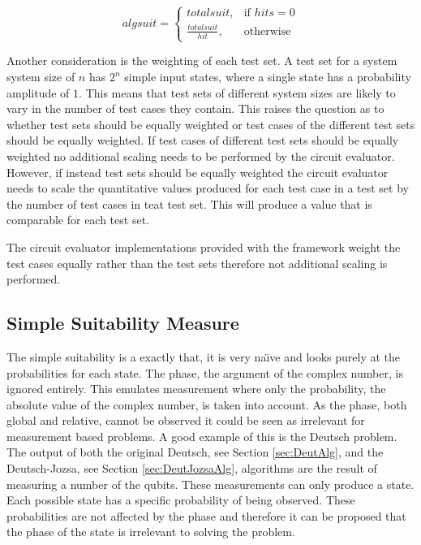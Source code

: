 \begin{equation}
 algsuit = 
\left\{
  \begin{array}{cc} totalsuit, & \mbox{if } hits={0}\\ 
  \frac{totalsuit}{hit}, & \mbox{otherwise}\end{array}
\right.
\label{eqn:cirevalhitsscaling}
\end{equation}

Another consideration is the weighting of each test set.
A test set for a system system size of $n$ has $2^n$ simple input states, where a single state has a probability amplitude of $1$.
This means that test sets of different system sizes are likely to vary in the number of test cases they contain.
This raises the question as to whether test sets should be equally weighted or test cases of the different test sets should be equally weighted.
If test cases of different test sets should be equally weighted no additional scaling needs to be performed by the circuit evaluator.
However, if instead test sets should be equally weighted the circuit evaluator needs to scale the quantitative values produced for each test case in a test set by the number of test cases in teat test set.
This will produce a value that is comparable for each test set.

The circuit evaluator implementations provided with the framework weight the test cases equally rather than the test sets therefore not additional scaling is performed.

\subsection{Simple Suitability Measure}
\label{sec:simplsuitmeas}
The simple suitability is a exactly that, it is very na\"{\i}ve and looks purely at the probabilities for each state.
The phase, the argument of the complex number, is ignored entirely.
This emulates measurement where only the probability, the absolute value of the complex number, is taken into account.
As the phase, both global and relative, cannot be observed it could be seen as irrelevant for measurement based problems.
A good example of this is the Deutsch problem.
The output of both the original Deutsch, see Section \ref{sec:DeutAlg}, and the Deutsch-Jozsa, see Section \ref{sec:DeutJozsaAlg}, algorithms are the result of measuring a number of the qubits.
These measurements can only produce a state.
Each possible state has a specific probability of being observed.
These probabilities are not affected by the phase and therefore it can be proposed that the phase of the state is irrelevant to solving the problem.


